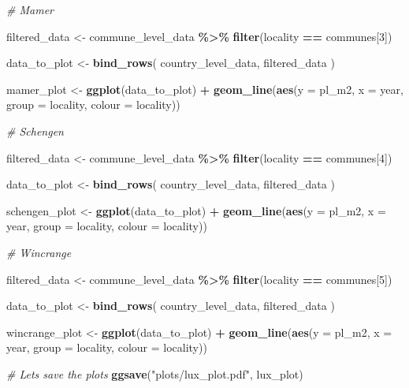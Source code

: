 \documentclass[
]{article}
\newenvironment{Shaded}{\begin{snugshade}}{\end{snugshade}}
\newcommand{\AttributeTok}[1]{\textcolor[rgb]{0.13,0.29,0.53}{#1}}
\newcommand{\CommentTok}[1]{\textcolor[rgb]{0.56,0.35,0.01}{\textit{#1}}}
\newcommand{\DecValTok}[1]{\textcolor[rgb]{0.00,0.00,0.81}{#1}}
\newcommand{\FunctionTok}[1]{\textcolor[rgb]{0.13,0.29,0.53}{\textbf{#1}}}
\newcommand{\NormalTok}[1]{#1}
\newcommand{\OtherTok}[1]{\textcolor[rgb]{0.56,0.35,0.01}{#1}}
\newcommand{\SpecialCharTok}[1]{\textcolor[rgb]{0.81,0.36,0.00}{\textbf{#1}}}
\newcommand{\StringTok}[1]{\textcolor[rgb]{0.31,0.60,0.02}{#1}}
\begin{document}
\begin{Shaded}
\begin{Highlighting}[]
\CommentTok{\# Mamer}

\NormalTok{filtered\_data }\OtherTok{\textless{}{-}}\NormalTok{ commune\_level\_data }\SpecialCharTok{\%\textgreater{}\%}
  \FunctionTok{filter}\NormalTok{(locality }\SpecialCharTok{==}\NormalTok{ communes[}\DecValTok{3}\NormalTok{])}

\NormalTok{data\_to\_plot }\OtherTok{\textless{}{-}} \FunctionTok{bind\_rows}\NormalTok{(}
\NormalTok{  country\_level\_data,}
\NormalTok{  filtered\_data}
\NormalTok{)}

\NormalTok{mamer\_plot }\OtherTok{\textless{}{-}} \FunctionTok{ggplot}\NormalTok{(data\_to\_plot) }\SpecialCharTok{+}
  \FunctionTok{geom\_line}\NormalTok{(}\FunctionTok{aes}\NormalTok{(}\AttributeTok{y =}\NormalTok{ pl\_m2,}
                \AttributeTok{x =}\NormalTok{ year,}
                \AttributeTok{group =}\NormalTok{ locality,}
                \AttributeTok{colour =}\NormalTok{ locality))}

\CommentTok{\# Schengen}

\NormalTok{filtered\_data }\OtherTok{\textless{}{-}}\NormalTok{ commune\_level\_data }\SpecialCharTok{\%\textgreater{}\%}
  \FunctionTok{filter}\NormalTok{(locality }\SpecialCharTok{==}\NormalTok{ communes[}\DecValTok{4}\NormalTok{])}

\NormalTok{data\_to\_plot }\OtherTok{\textless{}{-}} \FunctionTok{bind\_rows}\NormalTok{(}
\NormalTok{  country\_level\_data,}
\NormalTok{  filtered\_data}
\NormalTok{)}

\NormalTok{schengen\_plot }\OtherTok{\textless{}{-}} \FunctionTok{ggplot}\NormalTok{(data\_to\_plot) }\SpecialCharTok{+}
  \FunctionTok{geom\_line}\NormalTok{(}\FunctionTok{aes}\NormalTok{(}\AttributeTok{y =}\NormalTok{ pl\_m2,}
                \AttributeTok{x =}\NormalTok{ year,}
                \AttributeTok{group =}\NormalTok{ locality,}
                \AttributeTok{colour =}\NormalTok{ locality))}

\CommentTok{\# Wincrange}

\NormalTok{filtered\_data }\OtherTok{\textless{}{-}}\NormalTok{ commune\_level\_data }\SpecialCharTok{\%\textgreater{}\%}
  \FunctionTok{filter}\NormalTok{(locality }\SpecialCharTok{==}\NormalTok{ communes[}\DecValTok{5}\NormalTok{])}

\NormalTok{data\_to\_plot }\OtherTok{\textless{}{-}} \FunctionTok{bind\_rows}\NormalTok{(}
\NormalTok{  country\_level\_data,}
\NormalTok{  filtered\_data}
\NormalTok{)}

\NormalTok{wincrange\_plot }\OtherTok{\textless{}{-}} \FunctionTok{ggplot}\NormalTok{(data\_to\_plot) }\SpecialCharTok{+}
  \FunctionTok{geom\_line}\NormalTok{(}\FunctionTok{aes}\NormalTok{(}\AttributeTok{y =}\NormalTok{ pl\_m2,}
                \AttributeTok{x =}\NormalTok{ year,}
                \AttributeTok{group =}\NormalTok{ locality,}
                \AttributeTok{colour =}\NormalTok{ locality))}

\CommentTok{\# Let\textquotesingle{}s save the plots}
\FunctionTok{ggsave}\NormalTok{(}\StringTok{"plots/lux\_plot.pdf"}\NormalTok{, lux\_plot)}
\end{Highlighting}
\end{Shaded}
\end{document}
